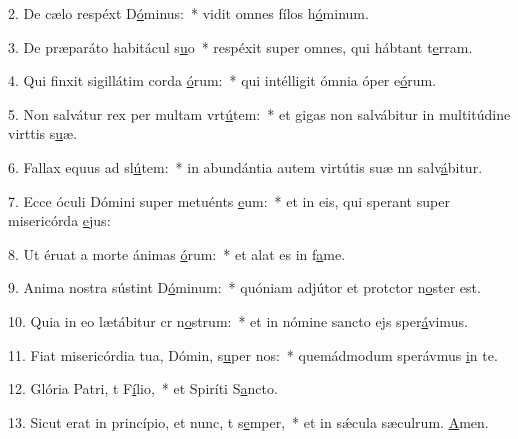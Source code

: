 2. De cælo respéxt D\uline{ó}minus:~* vidit omnes fílos h\uline{ó}minum.\par 
3. De præparáto habitácul s\uline{u}o~* respéxit super omnes, qui hábtant t\uline{e}rram.\par 
4. Qui finxit sigillátim corda \uline{ó}rum:~* qui intélligit ómnia óper e\uline{ó}rum.\par 
5. Non salvátur rex per multam vrt\uline{ú}tem:~* et gigas non salvábitur in multitúdine virttis s\uline{u}æ.\par 
6. Fallax equus ad sl\uline{ú}tem:~* in abundántia autem virtútis suæ nn salv\uline{á}bitur.\par 
7. Ecce óculi Dómini super metuénts \uline{e}um:~* et in eis, qui sperant super misericórda \uline{e}jus:\par 
8. Ut éruat a morte ánimas \uline{ó}rum:~* et alat es in f\uline{a}me.\par 
9. Anima nostra sústint D\uline{ó}minum:~* quóniam adjútor et protctor n\uline{o}ster est.\par 
10. Quia in eo lætábitur cr n\uline{o}strum:~* et in nómine sancto ejs sper\uline{á}vimus.\par 
11. Fiat misericórdia tua, Dómin, s\uline{u}per nos:~* quemádmodum sperávmus \uline{i}n te.\par 
12. Glória Patri, t F\uline{í}lio,~* et Spiríti S\uline{a}ncto.\par 
13. Sicut erat in princípio, et nunc, t s\uline{e}mper,~* et in sǽcula sæculrum. \uline{A}men.\par 
